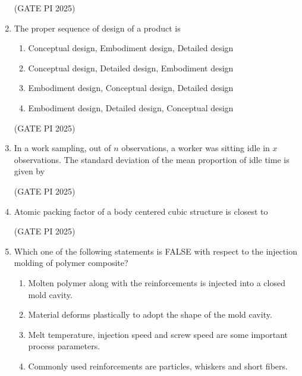 \documentclass[journal,12pt,onecolumn]{IEEEtran}
\theoremstyle{remark}
\begin{document}
\begin{enumerate}
\hfill (GATE PI 2025)

\item The proper sequence of design of a product is

\begin{enumerate}
\item Conceptual design, Embodiment design, Detailed design
\item Conceptual design, Detailed design, Embodiment design
\item Embodiment design, Conceptual design, Detailed design
\item Embodiment design, Detailed design, Conceptual design
\end{enumerate}

\hfill (GATE PI 2025)

\item In a work sampling, out of $n$ observations, a worker was sitting idle in $x$ observations. The standard deviation of the mean proportion of idle time is given by

\begin{enumerate}
\end{enumerate}

\hfill (GATE PI 2025)

\item Atomic packing factor of a body centered cubic structure is closest to

\begin{enumerate}
\end{enumerate}

\hfill (GATE PI 2025)

\item Which one of the following statements is FALSE with respect to the injection molding of polymer composite?

\begin{enumerate}
\item Molten polymer along with the reinforcements is injected into a closed mold cavity.
\item Material deforms plastically to adopt the shape of the mold cavity.
\item Melt temperature, injection speed and screw speed are some important process parameters.
\item Commonly used reinforcements are particles, whiskers and short fibers.
\end{enumerate}


\end{enumerate}
\end{document}
